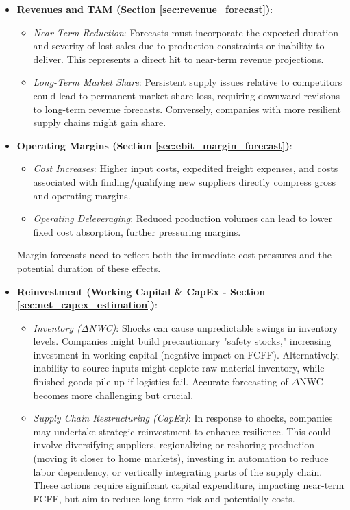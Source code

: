 \begin{itemize}
    \item \textbf{Revenues and TAM (Section \ref{sec:revenue_forecast})}:
          \begin{itemize}
              \item \textit{Near-Term Reduction}: Forecasts must incorporate the expected duration and severity of lost sales due to production constraints or inability to deliver. This represents a direct hit to near-term revenue projections.
              \item \textit{Long-Term Market Share}: Persistent supply issues relative to competitors could lead to permanent market share loss, requiring downward revisions to long-term revenue forecasts. Conversely, companies with more resilient supply chains might gain share.
          \end{itemize}

    \item \textbf{Operating Margins (Section \ref{sec:ebit_margin_forecast})}:
          \begin{itemize}
              \item \textit{Cost Increases}: Higher input costs, expedited freight expenses, and costs associated with finding/qualifying new suppliers directly compress gross and operating margins.
              \item \textit{Operating Deleveraging}: Reduced production volumes can lead to lower fixed cost absorption, further pressuring margins.
          \end{itemize}
          Margin forecasts need to reflect both the immediate cost pressures and the potential duration of these effects.

    \item \textbf{Reinvestment (Working Capital \& CapEx - Section \ref{sec:net_capex_estimation})}:
          \begin{itemize}
              \item \textit{Inventory (\(\Delta\)NWC)}: Shocks can cause unpredictable swings in inventory levels. Companies might build precautionary "safety stocks," increasing investment in working capital (negative impact on FCFF). Alternatively, inability to source inputs might deplete raw material inventory, while finished goods pile up if logistics fail. Accurate forecasting of \(\Delta\)NWC becomes more challenging but crucial.
              \item \textit{Supply Chain Restructuring (CapEx)}: In response to shocks, companies may undertake strategic reinvestment to enhance resilience. This could involve diversifying suppliers, regionalizing or reshoring production (moving it closer to home markets), investing in automation to reduce labor dependency, or vertically integrating parts of the supply chain. These actions require significant capital expenditure, impacting near-term FCFF, but aim to reduce long-term risk and potentially costs.
          \end{itemize}


\end{itemize}
